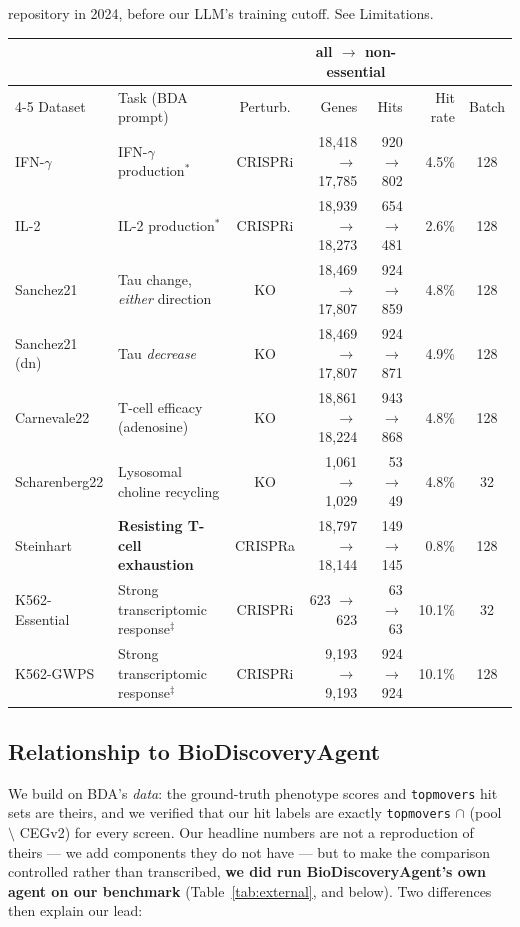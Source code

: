 \documentclass[11pt]{article}
\begin{document}
\begin{table}[H]
{  repository in 2024, before our LLM's training cutoff. See Limitations.
}
\label{tab:datasets}
\footnotesize
\setlength{\tabcolsep}{4pt}
\begin{tabular}{@{}llcrrrc@{}}
\toprule
 & & & \multicolumn{2}{c}{all $\rightarrow$ non-essential} & & \\
\cmidrule(lr){4-5}
Dataset & Task (BDA prompt) & Perturb. & Genes & Hits & Hit rate & Batch \\
\midrule
IFN-$\gamma$    & IFN-$\gamma$ production$^\ast$          & CRISPRi   & 18{,}418 $\rightarrow$ 17{,}785 & 920 $\rightarrow$ 802 & 4.5\% & 128 \\
IL-2            & IL-2 production$^\ast$                  & CRISPRi   & 18{,}939 $\rightarrow$ 18{,}273 & 654 $\rightarrow$ 481 & 2.6\% & 128 \\
Sanchez21       & Tau change, \emph{either} direction     & KO        & 18{,}469 $\rightarrow$ 17{,}807 & 924 $\rightarrow$ 859 & 4.8\% & 128 \\
Sanchez21 (dn)  & Tau \emph{decrease}                     & KO        & 18{,}469 $\rightarrow$ 17{,}807 & 924 $\rightarrow$ 871 & 4.9\% & 128 \\
Carnevale22     & T-cell efficacy (adenosine)             & KO        & 18{,}861 $\rightarrow$ 18{,}224 & 943 $\rightarrow$ 868 & 4.8\% & 128 \\
Scharenberg22   & Lysosomal choline recycling                   & KO        &  1{,}061 $\rightarrow$  1{,}029 &  53 $\rightarrow$  49 & 4.8\% &  32 \\
Steinhart       & \textbf{Resisting T-cell exhaustion}    & CRISPRa  & 18{,}797 $\rightarrow$ 18{,}144 & 149 $\rightarrow$ 145 & 0.8\% & 128 \\
K562-Essential  & Strong transcriptomic response$^\ddagger$     & CRISPRi   &     623 $\rightarrow$      623 &  63 $\rightarrow$  63 & 10.1\% & 32 \\
K562-GWPS       & Strong transcriptomic response$^\ddagger$     & CRISPRi   &  9{,}193 $\rightarrow$  9{,}193 & 924 $\rightarrow$ 924 & 10.1\% & 128 \\
\bottomrule
\end{tabular}
\end{table}

\subsection*{Relationship to BioDiscoveryAgent}

We build on BDA's \emph{data}: the ground-truth phenotype scores and \texttt{topmovers} hit sets are
theirs, and we verified that our hit labels are exactly \texttt{topmovers} $\cap$ (pool $\setminus$
CEGv2) for every screen. Our headline numbers are not a reproduction of theirs --- we add components
they do not have --- but to make the comparison controlled rather than transcribed, \textbf{we did run
BioDiscoveryAgent's own agent on our benchmark} (Table~\ref{tab:external}, and below). Two differences
then explain our lead:
\end{document}
